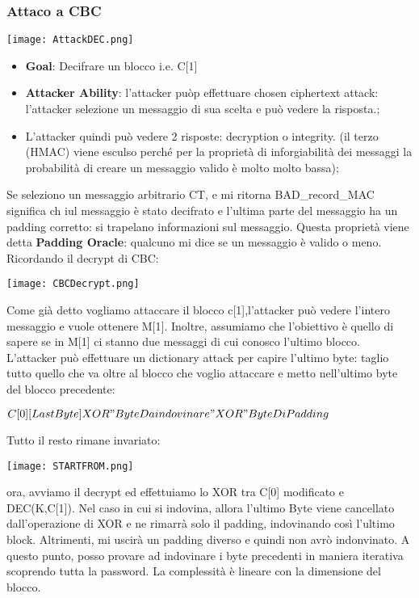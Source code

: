 \documentclass{article}
\theoremstyle{remark}
\begin{document}
\subsubsection{Attaco a CBC}
\begin{center}
	\texttt{[image: AttackDEC.png]}
\end{center}
\begin{itemize}
	\item \textbf{Goal}: Decifrare un blocco i.e. C[1]
	\item \textbf{Attacker Ability}: l'attacker puòp effettuare chosen ciphertext attack: l'attacker selezione un messaggio di sua scelta e può vedere la risposta.;
	\item L'attacker quindi può vedere 2 risposte: decryption o integrity. (il terzo (HMAC) viene esculso perché per la proprietà di inforgiabilità dei messaggi la probabilità di creare un messaggio valido è molto molto bassa);
\end{itemize}
Se seleziono un messaggio arbitrario CT, e mi ritorna BAD\_record\_MAC significa ch iul messaggio è stato decifrato e l'ultima parte del messaggio ha un padding corretto: si trapelano informazioni sul messaggio. Questa proprietà viene detta \textbf{Padding Oracle}: qualcuno mi dice se un messaggio è valido o meno. Ricordando il decrypt di CBC:
\begin{center}
	\texttt{[image: CBCDecrypt.png]}
\end{center}
Come già detto vogliamo attaccare il blocco c[1],l'attacker può vedere l'intero messaggio e vuole ottenere M[1]. Inoltre, assumiamo che l'obiettivo è quello di sapere se in M[1] ci stanno due messaggi di cui conosco l'ultimo blocco. L'attacker può effettuare un dictionary attack per capire l'ultimo byte: taglio tutto quello che va oltre al blocco che voglio attaccare e metto nell'ultimo byte del blocco precedente:\begin{center}
	$C[0][LastByte]XOR"ByteDaindovinare"XOR"ByteDiPadding$
\end{center}
Tutto il resto rimane invariato:\begin{center}
	\texttt{[image: STARTFROM.png]}
\end{center}
ora, avviamo il decrypt ed effettuiamo lo XOR tra C[0] modificato e DEC(K,C[1]). Nel caso in cui si indovina, allora l'ultimo Byte viene cancellato dall'operazione di XOR e ne rimarrà solo il padding, indovinando così l'ultimo block. Altrimenti, mi uscirà un padding diverso e quindi non avrò indonvinato. A questo punto, posso provare ad indovinare i byte precedenti in maniera iterativa scoprendo tutta la password. La complessità è lineare con la dimensione del blocco.
\end{document}
